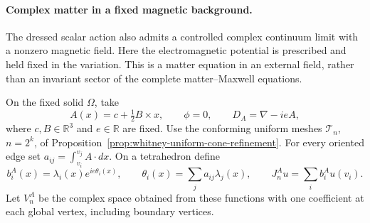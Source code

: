 \paragraph{Complex matter in a fixed magnetic background.}
The dressed scalar action also admits a controlled complex continuum
limit with a nonzero magnetic field. Here the electromagnetic potential
is prescribed and held fixed in the variation. This is a matter equation
in an external field, rather than an invariant sector of the complete
matter--Maxwell equations.

On the fixed solid \(\Omega\), take
\[
 A(x)=c+\tfrac12 B\times x,\qquad \phi=0,\qquad
 D_A=\nabla-ieA,
\]
where \(c,B\in\mathbb R^3\) and \(e\in\mathbb R\) are fixed.
Use the conforming uniform meshes \(\mathcal T_n\), \(n=2^k\),
of Proposition~\ref{prop:whitney-uniform-cone-refinement}.
For every oriented edge set \(a_{ij}=\int_{v_i}^{v_j}A\cdot dx\).
On a tetrahedron define
\[
 b_i^A(x)=\lambda_i(x)e^{ie\theta_i(x)},\qquad
 \theta_i(x)=\sum_j a_{ij}\lambda_j(x),\qquad
 J_n^Au=\sum_i b_i^A u(v_i).
\]
Let \(V_n^A\) be the complex space obtained from these functions
with one coefficient at each global vertex, including boundary vertices.

